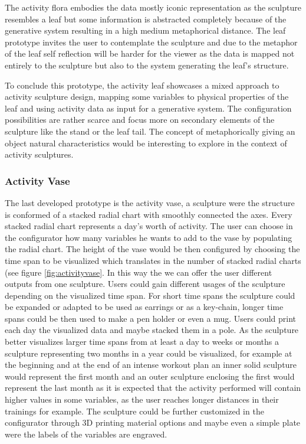 \documentclass[../medieninformatik-arbeit.tex]{subfiles}
\begin{document}
The activity flora embodies the data mostly iconic representation as the sculpture resembles a leaf but some information is abstracted completely because of the generative system resulting in a high medium metaphorical distance. The leaf prototype invites the user to contemplate the sculpture and due to the metaphor of the leaf self reflection will be harder for the viewer as the data is mapped not entirely to the sculpture but also to the system generating the leaf's structure.

To conclude this prototype, the activity leaf showcases a mixed approach to activity sculpture design, mapping some variables to physical properties of the leaf and using activity data as input for a generative system. The configuration possibilities are rather scarce and focus more on secondary elements of the sculpture like the stand or the leaf tail. The concept of metaphorically giving an object natural characteristics would be interesting to explore in the context of activity sculptures.

\subsubsection{Activity Vase}
The last developed prototype is the activity vase, a sculpture were the structure is conformed of a stacked radial chart with smoothly connected the axes. Every stacked radial chart represents a day's worth of activity. The user can choose in the configurator how many variables he wants to add to the vase by populating the radial chart. The height of the vase would be then configured by choosing the time span to be visualized which translates in the number of stacked radial charts (see figure \ref{fig:activityvase}. In this way the we can offer the user different outputs from one sculpture. Users could gain different usages of the sculpture depending on the visualized time span. For short time spans the sculpture could be expanded or adapted to be used as earrings or as a key-chain, longer time spans could be then used to make a pen holder or even a mug. Users could print each day the visualized data and maybe stacked them in a pole. As the sculpture better visualizes larger time spans from at least a day to weeks or months a sculpture representing two months in a year could be visualized, for example at the beginning and at the end of an intense workout plan an inner solid sculpture would represent the first month and an outer sculpture enclosing the first would represent the last month as it is expected that the activity performed will contain higher values in some variables, as the user reaches longer distances in their trainings for example. The sculpture could be further customized in the configurator through 3D printing material options and maybe even a simple plate were the labels of the variables are engraved. 
\end{document}
